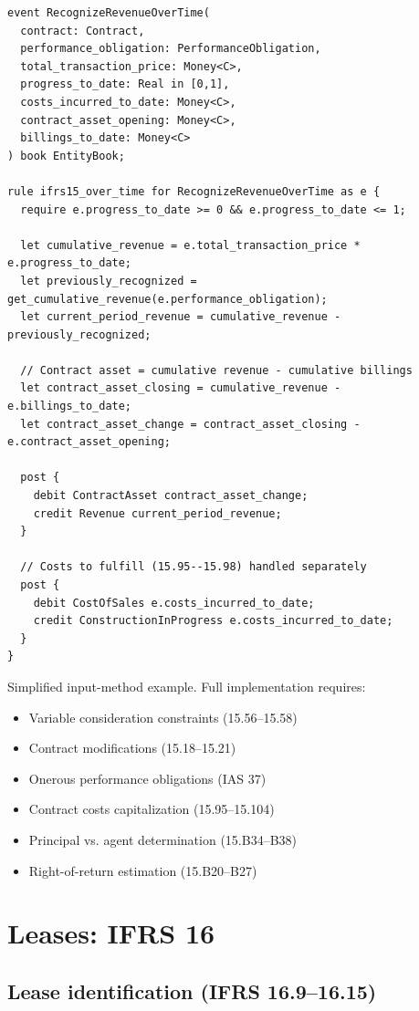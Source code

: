 \begin{lstlisting}
event RecognizeRevenueOverTime(
  contract: Contract,
  performance_obligation: PerformanceObligation,
  total_transaction_price: Money<C>,
  progress_to_date: Real in [0,1],
  costs_incurred_to_date: Money<C>,
  contract_asset_opening: Money<C>,
  billings_to_date: Money<C>
) book EntityBook;

rule ifrs15_over_time for RecognizeRevenueOverTime as e {
  require e.progress_to_date >= 0 && e.progress_to_date <= 1;

  let cumulative_revenue = e.total_transaction_price * e.progress_to_date;
  let previously_recognized = get_cumulative_revenue(e.performance_obligation);
  let current_period_revenue = cumulative_revenue - previously_recognized;

  // Contract asset = cumulative revenue - cumulative billings
  let contract_asset_closing = cumulative_revenue - e.billings_to_date;
  let contract_asset_change = contract_asset_closing - e.contract_asset_opening;

  post {
    debit ContractAsset contract_asset_change;
    credit Revenue current_period_revenue;
  }

  // Costs to fulfill (15.95--15.98) handled separately
  post {
    debit CostOfSales e.costs_incurred_to_date;
    credit ConstructionInProgress e.costs_incurred_to_date;
  }
}
\end{lstlisting}

 Simplified input-method example. Full implementation
requires:
\begin{itemize}
\item Variable consideration constraints (15.56--15.58)
\item Contract modifications (15.18--15.21)
\item Onerous performance obligations (IAS 37)
\item Contract costs capitalization (15.95--15.104)
\item Principal vs. agent determination (15.B34--B38)
\item Right-of-return estimation (15.B20--B27)
\end{itemize}

\section{Leases: IFRS 16}

\subsection{Lease identification (IFRS 16.9--16.15)}

